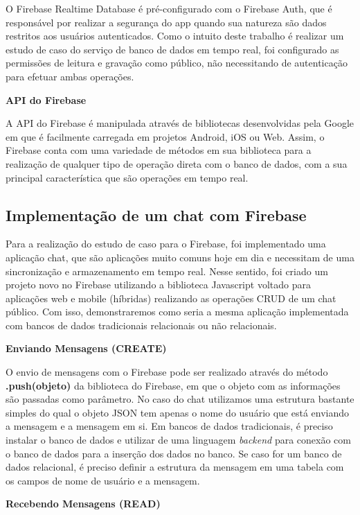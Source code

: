 \documentclass[12pt]{article}
\begin{document}
O Firebase Realtime Database é pré-configurado com o Firebase Auth, que é responsável por realizar a segurança do app quando sua natureza são dados restritos aos usuários autenticados. Como o intuito deste trabalho é realizar um estudo de caso do serviço de banco de dados em tempo real, foi configurado as permissões de leitura e gravação como público, não necessitando de autenticação para efetuar ambas operações.

\textbf{API do Firebase}

A API do Firebase é manipulada através de bibliotecas desenvolvidas pela Google em que é facilmente carregada em projetos Android, iOS ou Web. Assim, o Firebase conta com uma variedade de métodos em sua biblioteca para a realização de qualquer tipo de operação direta com o banco de dados, com a sua principal característica que são operações em tempo real. 

\subsection{Implementação de um chat com Firebase}

Para a realização do estudo de caso para o Firebase, foi implementado uma aplicação chat, que são aplicações muito comuns hoje em dia e necessitam de uma sincronização e armazenamento em tempo real. Nesse sentido, foi criado um projeto novo no Firebase utilizando a biblioteca Javascript voltado para aplicações web e mobile (híbridas) realizando as operações CRUD de um chat público. Com isso,  demonstraremos como seria a mesma aplicação implementada com bancos de dados tradicionais relacionais ou não relacionais.

\textbf{Enviando Mensagens (CREATE)}

O envio de mensagens com o Firebase pode ser realizado através do método \textbf{.push(objeto)} da biblioteca do Firebase, em que o objeto com as informações são passadas como parâmetro. No caso do chat utilizamos uma estrutura bastante simples do qual o objeto JSON tem apenas o nome do usuário que está enviando a mensagem e a mensagem em si. Em bancos de dados tradicionais, é preciso instalar o banco de dados e utilizar de uma linguagem \textit{backend} para conexão com o banco de dados para a inserção dos dados no banco. Se caso for um banco de dados relacional, é preciso definir a estrutura da mensagem em uma tabela com os campos de nome de usuário e a mensagem.

\textbf{Recebendo Mensagens (READ)}
\end{document}
